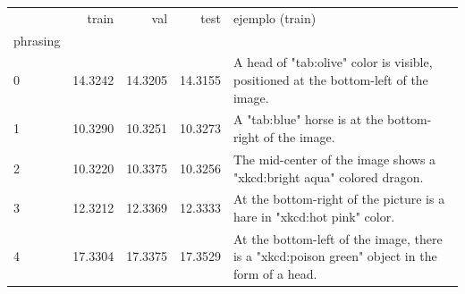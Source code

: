 \begin{tabular}{lrrrl}
\toprule
 & train & val & test & ejemplo (train) \\
phrasing &  &  &  &  \\
\midrule
0 & 14.3242 & 14.3205 & 14.3155 & A head of "tab:olive" color is visible, positioned at the bottom-left of the image. \\
1 & 10.3290 & 10.3251 & 10.3273 & A "tab:blue" horse is at the bottom-right of the image. \\
2 & 10.3220 & 10.3375 & 10.3256 & The mid-center of the image shows a "xkcd:bright aqua" colored dragon. \\
3 & 12.3212 & 12.3369 & 12.3333 & At the bottom-right of the picture is a hare in "xkcd:hot pink" color. \\
4 & 17.3304 & 17.3375 & 17.3529 & At the bottom-left of the image, there is a "xkcd:poison green" object in the form of a head. \\
\bottomrule
\end{tabular}
